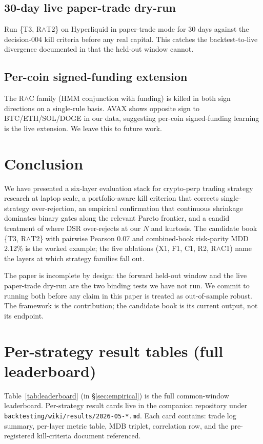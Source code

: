 \documentclass[11pt]{article}
\begin{document}
\subsection{30-day live paper-trade dry-run}
Run \{T3, R$\wedge$T2\} on Hyperliquid in paper-trade mode for 30 days
against the decision-004 kill criteria before any real capital. This catches
the backtest-to-live divergence documented in
\citet{backtestlive2026} that the held-out window cannot.

\subsection{Per-coin signed-funding extension}
The R$\wedge$C family (HMM conjunction with funding) is killed in both
sign directions on a single-rule basis. AVAX shows opposite sign to
BTC/ETH/SOL/DOGE in our data, suggesting per-coin signed-funding learning is
the live extension. We leave this to future work.

\section{Conclusion}
\label{sec:conclusion}

We have presented a six-layer evaluation stack for crypto-perp trading
strategy research at laptop scale, a portfolio-aware kill criterion that
corrects single-strategy over-rejection, an empirical confirmation that
continuous shrinkage dominates binary gates along the relevant Pareto
frontier, and a candid treatment of where DSR over-rejects at our $N$ and
kurtosis. The candidate book \{T3, R$\wedge$T2\} with pairwise Pearson 0.07
and combined-book risk-parity MDD 2.12\% is the worked example; the five
ablations (X1, F1, C1, R2, R$\wedge$C1) name the layers at which strategy
families fall out.

The paper is incomplete by design: the forward held-out window and the live
paper-trade dry-run are the two binding tests we have not run. We commit to
running both before any claim in this paper is treated as out-of-sample
robust. The framework is the contribution; the candidate book is its current
output, not its endpoint.



\appendix

\section{Per-strategy result tables (full leaderboard)}
\label{app:leaderboard}
Table~\ref{tab:leaderboard} (in \S\ref{sec:empirical}) is the full
common-window leaderboard. Per-strategy result cards live in the companion
repository under
\texttt{backtesting/wiki/results/2026-05-*.md}. Each card contains: trade
log summary, per-layer metric table, MDB triplet, correlation row, and the
pre-registered kill-criteria document referenced.
\end{document}
